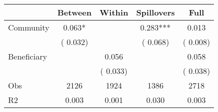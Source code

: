 
\begin{tabular}{l*{4}{c}}\hline&\multicolumn{1}{c}{Between}&\multicolumn{1}{c}{Within}&\multicolumn{1}{c}{Spillovers}&\multicolumn{1}{c}{Full}\\ \hline
 Community             &              0.063*      &                                               &        0.283*** &         0.013                            \\ 
                               &        (       0.032)           &                                       &       (       0.068)     &      (       0.008)                                           \\ 
 Beneficiary   &                                               &        0.056    &                                &             0.058                            \\ 
                               &                                               & (       0.033)                  &                                        &      (       0.038)                                           \\ 
\hline                                                                                                                                                                                                                                            
 Obs                   &               2126               &       1924                       &       1386                &              2718                                               \\ 
 R2                    &                      0.003              &              0.001                      &              0.030               &                     0.003                                              \\ 
\hline \end{tabular}                                                                                                                                                                                                              